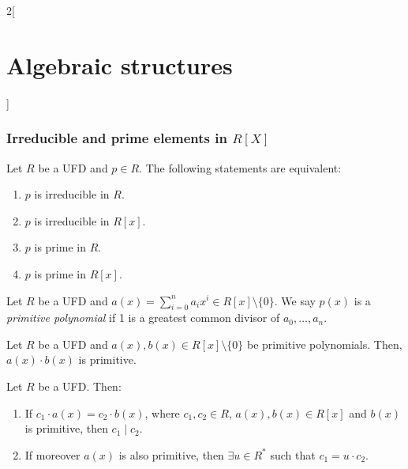 \documentclass[../../../main.tex]{subfiles}
\begin{document}
\begin{multicols}{2}[\section{Algebraic structures}]
\begin{theorem}
\begin{enumerate}
        \end{enumerate}
        \begin{center}
            \begin{minipage}{\linewidth}
                \centering
                
                \label{theorem4}
            \end{minipage}
        \end{center}
    \end{theorem}
    \subsubsection{Irreducible and prime elements in $R[X]$}
    \begin{prop}
        Let $R$ be a UFD and $p\in R$. The following statements are equivalent:
        \begin{enumerate}
            \item $p$ is irreducible in $R$.
            \item $p$ is irreducible in $R[x]$.
            \item $p$ is prime in $R$.
            \item $p$ is prime in $R[x]$.
        \end{enumerate}
    \end{prop}
    \begin{definition}
        Let $R$ be a UFD and $a(x)=\sum_{i=0}^na_ix^i\in R[x]\setminus\{0\}$. We say $p(x)$ is a \textit{primitive polynomial} if 1 is a greatest common divisor of $a_0,\ldots,a_n$.
    \end{definition}
    \begin{lemma}
        Let $R$ be a UFD and $a(x),b(x)\in R[x]\setminus\{0\}$ be primitive polynomials. Then, $a(x)\cdot b(x)$ is primitive.
    \end{lemma}
    \begin{lemma}
        Let $R$ be a UFD. Then:
        \begin{enumerate}
            \item If $c_1\cdot a(x)=c_2\cdot b(x)$, where $c_1,c_2\in R$, $a(x),b(x)\in R[x]$ and $b(x)$ is primitive, then $c_1\mid c_2$.
            \item If moreover $a(x)$ is also primitive, then $\exists u\in R^*$ such that $c_1=u\cdot c_2$.
        \end{enumerate}
    \end{lemma}

\end{multicols}
\end{document}
